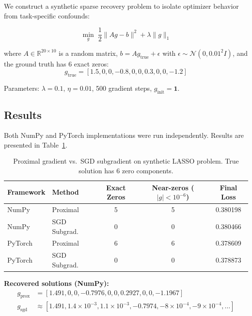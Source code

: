 \documentclass[12pt,a4paper]{article}
\theoremstyle{definition}
\begin{document}
We construct a synthetic sparse recovery problem to isolate optimizer behavior from task-specific confounds:

\begin{equation}
\min_g \; \frac{1}{2}\|Ag - b\|^2 + \lambda \|g\|_1
\end{equation}

where $A \in \mathbb{R}^{20 \times 10}$ is a random matrix, $b = Ag_{\text{true}} + \epsilon$ with $\epsilon \sim \mathcal{N}(0, 0.01^2 I)$, and the ground truth has 6 exact zeros:
\begin{equation}
g_{\text{true}} = [1.5, 0, 0, -0.8, 0, 0, 0.3, 0, 0, -1.2]
\end{equation}

Parameters: $\lambda = 0.1$, $\eta = 0.01$, 500 gradient steps, $g_{\text{init}} = \mathbf{1}$.

\subsection{Results}

Both NumPy and PyTorch implementations were run independently. Results are presented in Table~\ref{tab:task2_results}.

\begin{table}[H]
\centering
\caption{Proximal gradient vs.\ SGD subgradient on synthetic LASSO problem. True solution has 6 zero components.}
\label{tab:task2_results}
\begin{tabular}{llccc}
\toprule
\textbf{Framework} & \textbf{Method} & \textbf{Exact Zeros} & \textbf{Near-zeros ($|g|<10^{-6}$)} & \textbf{Final Loss} \\
\midrule
NumPy   & Proximal     & 5 & 5 & 0.380198 \\
NumPy   & SGD Subgrad. & 0 & 0 & 0.380466 \\
PyTorch & Proximal     & 6 & 6 & 0.378609 \\
PyTorch & SGD Subgrad. & 0 & 0 & 0.378873 \\
\bottomrule
\end{tabular}
\end{table}

\textbf{Recovered solutions (NumPy):}
\begin{align}
g_{\text{prox}} &= [1.491, 0, 0, -0.7976, 0, 0, 0.2927, 0, 0, -1.1967] \\
g_{\text{sgd}} &\approx [1.491, 1.4\times10^{-3}, 1.1\times10^{-3}, -0.7974, -8\times10^{-4}, -9\times10^{-4}, \ldots]
\end{align}
\end{document}

